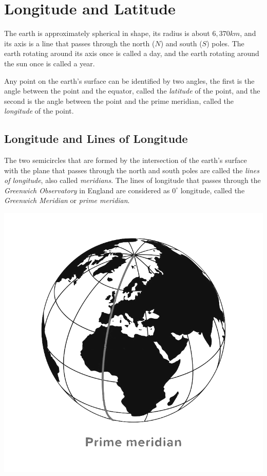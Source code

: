 \documentclass{report}
\begin{document}
\begin{multicols}{2}
\begin{enumerate}
    \end{enumerate}

    \section {Longitude and Latitude}

    The earth is approximately spherical in shape, its radius is about $6,370km$,
    and its axis is a line that passes through the north ({$N$}) and south ($S$)
    poles. The earth rotating around its axis once is called a day, and the earth
    rotating around the sun once is called a year.

    Any point on the earth's surface can be identified by two angles, the first is
    the angle between the point and the equator, called the \emph{latitude} of the
    point, and the second is the angle between the point and the prime meridian,
    called the \emph{longitude} of the point.

    \subsection*{Longitude and Lines of Longitude}

    The two semicircles that are formed by the intersection of the earth's surface
    with the plane that passes through the north and south poles are called the
    \emph{lines of longitude}, also called \emph{meridians}. The lines of longitude
    that passes through the \emph{Greenwich Observatory} in England are considered
    as $0^{\circ}$ longitude, called the \emph{Greenwich Meridian} or \emph{prime
        meridian}.

    \begin{center}
        \includegraphics[scale=0.25]{primemeridian}
    \end{center}


\end{multicols}
\end{document}
